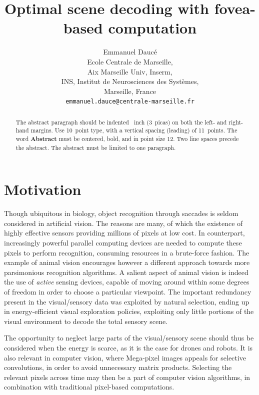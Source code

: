 \documentclass{article}
\title{Optimal scene decoding with fovea-based computation} %
\author{
  Emmanuel Daucé\\
  Ecole Centrale de Marseille,\\ 
  Aix Marseille Univ, Inserm,\\ 
  INS, Institut de Neurosciences des Systèmes, \\
  Marseille, France\\
  \texttt{emmanuel.dauce@centrale-marseille.fr} \\
}
\begin{document}

\maketitle

\begin{abstract}
  The abstract paragraph should be indented ~inch
  (3~picas) on both the left- and right-hand margins. Use 10~point
  type, with a vertical spacing (leading) of 11~points.  The word
  \textbf{Abstract} must be centered, bold, and in point size 12. Two
  line spaces precede the abstract. The abstract must be limited to
  one paragraph.
\end{abstract}

\section{Motivation}

Though ubiquitous in biology, object recognition through saccades is seldom considered in artificial vision. The reasons are many, of which the existence of highly effective sensors providing millions of pixels at low cost. %
In counterpart, increasingly powerful parallel computing devices are needed to compute these pixels to perform recognition, consuming resources in a brute-force fashion. 
The example of animal vision encourages however a different approach towards more parsimonious recognition algorithms. A salient aspect of animal vision is indeed the use of \emph{active} sensing devices, capable of moving around within some degrees of freedom in order to choose a particular viewpoint. The important redundancy present in the {\color{blue} visual/sensory} data was exploited by natural selection,  ending up in energy-efficient visual exploration policies, exploiting only little portions of the visual environment to decode the total sensory scene.

The opportunity to neglect large parts of the {\color{blue} visual/sensory} scene should thus be considered when the energy is scarce, as it is the case for drones and robots. 
It is also relevant in computer vision, where Mega-pixel images appeals for selective convolutions, in order to avoid unnecessary matrix products. 
Selecting the relevant pixels across time may then be a part of computer vision algorithms, in combination with traditional pixel-based computations. 
\end{document}
